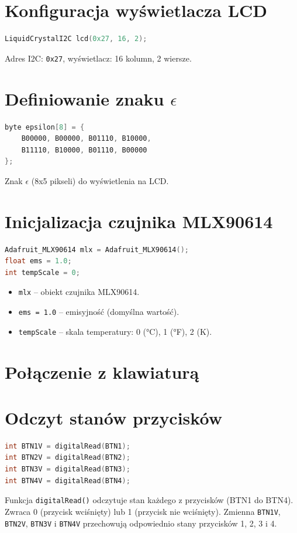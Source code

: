 \section*{Konfiguracja wyświetlacza LCD}
\begin{lstlisting}[language=C++]
LiquidCrystalI2C lcd(0x27, 16, 2);
\end{lstlisting}
Adres I2C: \texttt{0x27}, wyświetlacz: 16 kolumn, 2 wiersze.

\section*{Definiowanie znaku \(\epsilon\)}
\begin{lstlisting}[language=C++]
byte epsilon[8] = { 
    B00000, B00000, B01110, B10000, 
    B11110, B10000, B01110, B00000 
};
\end{lstlisting}
Znak \(\epsilon\) (8x5 pikseli) do wyświetlenia na LCD.

\section*{Inicjalizacja czujnika MLX90614}
\begin{lstlisting}[language=C++]
Adafruit_MLX90614 mlx = Adafruit_MLX90614();
float ems = 1.0;
int tempScale = 0;
\end{lstlisting}
\begin{itemize}
    \item \texttt{mlx} – obiekt czujnika MLX90614.
    \item \texttt{ems = 1.0} – emisyjność (domyślna wartość).
    \item \texttt{tempScale} – skala temperatury: 0 (°C), 1 (°F), 2 (K).
\end{itemize}

\section{Połączenie z klawiaturą}

\section*{Odczyt stanów przycisków}
\begin{lstlisting}[language=C++]
int BTN1V = digitalRead(BTN1);
int BTN2V = digitalRead(BTN2);
int BTN3V = digitalRead(BTN3);
int BTN4V = digitalRead(BTN4);
\end{lstlisting}
Funkcja \texttt{digitalRead()} odczytuje stan każdego z przycisków (BTN1 do BTN4). Zwraca 0 (przycisk wciśnięty) lub 1 (przycisk nie wciśnięty). Zmienna \texttt{BTN1V}, \texttt{BTN2V}, \texttt{BTN3V} i \texttt{BTN4V} przechowują odpowiednio stany przycisków 1, 2, 3 i 4.

